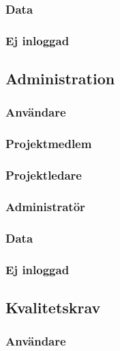 \documentclass[a4paper]{article}
\begin{document}
\begin{ST}
\subsubsection{Data}
\subsubsection{Ej inloggad}






\subsection{Administration}


\subsubsection{Användare}
\subsubsection{Projektmedlem}
\subsubsection{Projektledare}
\subsubsection{Administratör}
\subsubsection{Data}
\subsubsection{Ej inloggad}






\subsection{Kvalitetskrav}

\subsubsection{Användare}

\end{ST}
\end{document}
